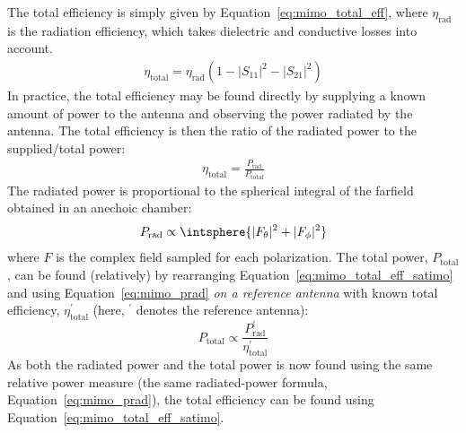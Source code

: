 The total efficiency is simply given by Equation~\ref{eq:mimo_total_eff}\cite{Tatomirescu2011PortIsolation}, where $\eta_{\text{rad}}$ is the radiation efficiency, which takes dielectric and conductive losses into account. 
\begin{align} 
\label{eq:mimo_total_eff}
\eta_{\text{total}}=\eta_{\text{rad}} (1-|S_{11}|^2 - |S_{21}|^2)
\end{align}
In practice, the total efficiency may be found directly by supplying a known amount of power to the antenna and observing the power radiated by the antenna. The total efficiency is then the ratio of the radiated power to the supplied/total power:
\begin{align}
    \label{eq:mimo_total_eff_satimo}
    \eta_{\text{total}} = \frac{P_{\text{rad}}}{P_{\text{total}}}
\end{align}
The radiated power is proportional to the spherical integral of the farfield obtained in an anechoic chamber:
\begin{equation}
    \label{eq:mimo_prad}
    P_{\text{rad}} \propto \intsphere{|F_{\theta}|^2 + |F_{\phi}|^2}
\end{equation}
where $F$ is the complex field sampled for each polarization. The total power, $P_{\text{total}}$, can be found (relatively) by rearranging Equation~\ref{eq:mimo_total_eff_satimo} and using Equation~\ref{eq:mimo_prad} \emph{on a reference antenna} with known total efficiency, $\eta_{\text{total}}^{\prime}$ (here, $^{\prime}$ denotes the reference antenna):
\begin{equation}
    \label{eq:mimo_ptot}
    P_{\text{total}} \propto \frac{P_{\text{rad}}^{\prime}}{\eta_{\text{total}}^{\prime}}
\end{equation}
As both the radiated power and the total power is now found using the same relative power measure (the same radiated-power formula, Equation~\ref{eq:mimo_prad}), the total efficiency can be found using Equation~\ref{eq:mimo_total_eff_satimo}.

